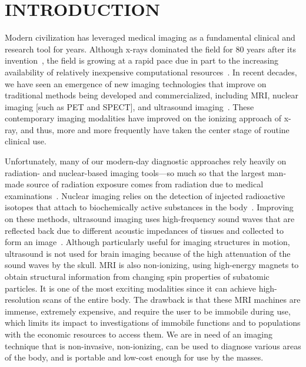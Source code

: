 
\chapter{INTRODUCTION} %
\label{chap:introduction}

Modern civilization has leveraged medical imaging as a fundamental clinical and research tool for years. Although x-rays dominated the field for 80 years after its invention~\cite{Gunderman2012}, the field is growing at a rapid pace due in part to the increasing availability of relatively inexpensive computational resources~\cite{Iglehart2006}. In recent decades, we have seen an emergence of new imaging technologies that improve on traditional methods being developed and commercialized, including \ac{MRI}, nuclear imaging [such as \ac{PET} and \ac{SPECT}], and ultrasound imaging~\cite{Suetens2017}. These contemporary imaging modalities have improved on the ionizing approach of x-ray, and thus, more and more frequently have taken the center stage of routine clinical use. 

Unfortunately, many of our modern-day diagnostic approaches rely heavily on radiation- and nuclear-based imaging tools---so much so that the largest man-made source of radiation exposure comes from radiation due to medical examinations~\cite{Picano2004}. Nuclear imaging relies on the detection of injected radioactive isotopes that attach to biochemically active substances in the body~\cite{Fahey2002}. Improving on these methods, ultrasound imaging uses high-frequency sound waves that are reflected back due to different acoustic impedances of tissues and collected to form an image~\cite{Chan2011}. Although particularly useful for imaging structures in motion, ultrasound is not used for brain imaging because of the high attenuation of the sound waves by the skull. \ac{MRI} is also non-ionizing, using high-energy magnets to obtain structural information from changing spin properties of subatomic particles\cite{Plewes2012}. It is one of the most exciting modalities since it can achieve high-resolution scans of the entire body. The drawback is that these \ac{MRI} machines are immense, extremely expensive, and require the user to be immobile during use, which limits its impact to investigations of immobile functions and to populations with the economic resources to access them. We are in need of an imaging technique that is non-invasive, non-ionizing, can be used to diagnose various areas of the body, and is portable and low-cost enough for use by the masses.

